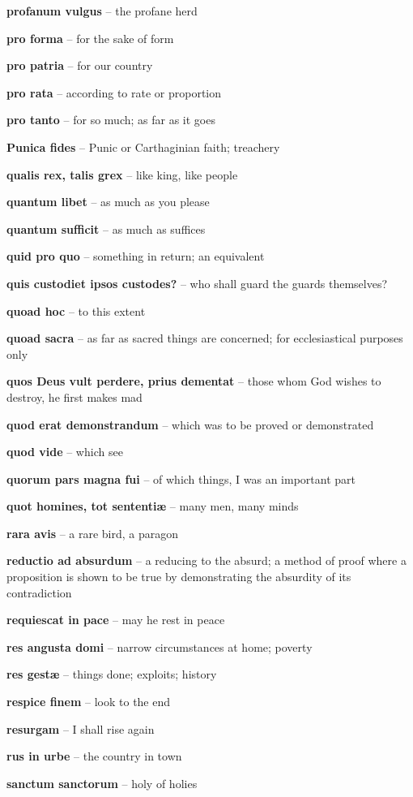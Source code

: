 \documentclass[12pt]{article}
\newcommand{\lat}[1]{\textbf{#1}}
\begin{document}
\lat{profanum vulgus} -- the profane herd

\lat{pro forma} -- for the sake of form

\lat{pro patria} -- for our country

\lat{pro rata} -- according to rate or proportion

\lat{pro tanto} -- for so much; as far as it goes

\lat{Punica fides} -- Punic or Carthaginian faith; treachery

\lat{qualis rex, talis grex} -- like king, like people

\lat{quantum libet} -- as much as you please

\lat{quantum sufficit} -- as much as suffices

\lat{quid pro quo} -- something in return; an equivalent

\lat{quis custodiet ipsos custodes?} -- who shall guard the guards themselves?

\lat{quoad hoc} -- to this extent

\lat{quoad sacra} -- as far as sacred things are concerned; for ecclesiastical purposes only

\lat{quos Deus vult perdere, prius dementat} -- those whom God wishes to destroy, he first makes mad

\lat{quod erat demonstrandum} -- which was to be proved or demonstrated

\lat{quod vide} -- which see

\lat{quorum pars magna fui} -- of which things, I was an important part

\lat{quot homines, tot sententi\ae} -- many men, many minds

\lat{rara avis} -- a rare bird, a paragon

\lat{reductio ad absurdum} -- a reducing to the absurd; a method of proof where a proposition is shown to be true by demonstrating the absurdity of its contradiction

\lat{requiescat in pace} -- may he rest in peace

\lat{res angusta domi} -- narrow circumstances at home; poverty

\lat{res gest\ae} -- things done; exploits; history

\lat{respice finem} -- look to the end

\lat{resurgam} -- I shall rise again

\lat{rus in urbe} -- the country in town

\lat{sanctum sanctorum} -- holy of holies
\end{document}

